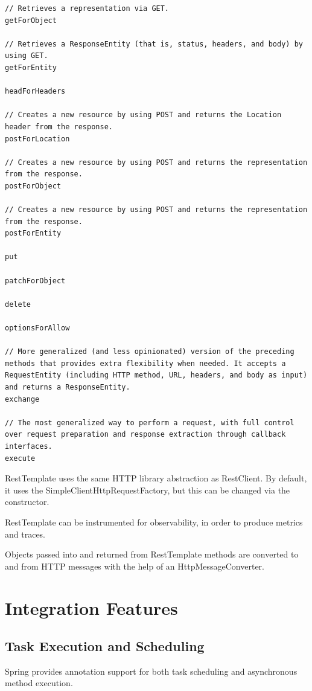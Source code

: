 \documentclass{scrartcl}
\begin{document}
\begin{lstlisting}
// Retrieves a representation via GET.
getForObject

// Retrieves a ResponseEntity (that is, status, headers, and body) by using GET.
getForEntity

headForHeaders

// Creates a new resource by using POST and returns the Location header from the response.
postForLocation

// Creates a new resource by using POST and returns the representation from the response.
postForObject

// Creates a new resource by using POST and returns the representation from the response.
postForEntity

put

patchForObject

delete

optionsForAllow

// More generalized (and less opinionated) version of the preceding methods that provides extra flexibility when needed. It accepts a RequestEntity (including HTTP method, URL, headers, and body as input) and returns a ResponseEntity.
exchange

// The most generalized way to perform a request, with full control over request preparation and response extraction through callback interfaces.
execute
\end{lstlisting}

RestTemplate uses the same HTTP library abstraction as RestClient. By default, it uses the SimpleClientHttpRequestFactory, but this can be changed via the constructor.

RestTemplate can be instrumented for observability, in order to produce metrics and traces.

Objects passed into and returned from RestTemplate methods are converted to and from HTTP messages with the help of an HttpMessageConverter.

\section{Integration Features}

\subsection{Task Execution and Scheduling}
Spring provides annotation support for both task scheduling and asynchronous method execution.
\end{document}
